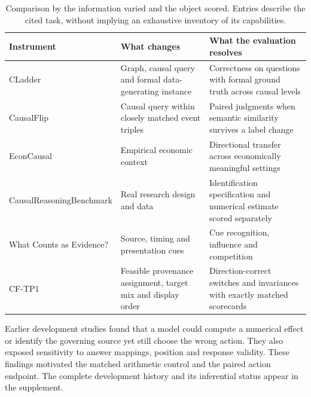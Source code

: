 \begin{table}[t]\centering\small\caption{Comparison by the information varied and the object scored. Entries describe the cited task, without implying an exhaustive inventory of its capabilities.}\label{tab:prior}
\begin{tabularx}{\linewidth}{@{}>{\raggedright\arraybackslash}p{.28\linewidth}>{\raggedright\arraybackslash}X>{\raggedright\arraybackslash}X@{}}\toprule
Instrument & What changes & What the evaluation resolves\\\midrule
CLadder \citep{cladder} & Graph, causal query and formal data-generating instance & Correctness on questions with formal ground truth across causal levels\\
CausalFlip \citep{flip} & Causal query within closely matched event triples & Paired judgments when semantic similarity survives a label change\\
EconCausal \citep{econ} & Empirical economic context & Directional transfer across economically meaningful settings\\
CausalReasoning\-Benchmark \citep{crb} & Real research design and data & Identification specification and numerical estimate scored separately\\
What Counts as Evidence? \citep{cue} & Source, timing and presentation cues & Cue recognition, influence and competition\\
CF-TP1 & Feasible provenance assignment, target mix and display order & Direction-correct switches and invariances with exactly matched scorecards\\\bottomrule
\end{tabularx}\end{table}

Earlier development studies found that a model could compute a numerical effect or identify the governing source yet still choose the wrong action. They also exposed sensitivity to answer mappings, position and response validity. These findings motivated the matched arithmetic control and the paired action endpoint. The complete development history and its inferential status appear in the supplement.

